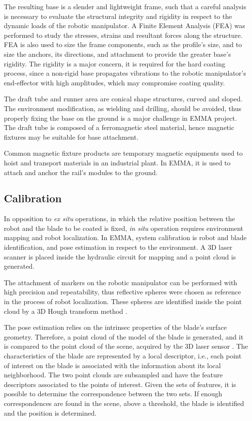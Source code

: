 The resulting base is a slender and lightweight frame, such that a careful
analysis is necessary to evaluate the structural integrity and rigidity in
respect to the dynamic loads of the robotic manipulator. A Finite Element
Analysis (FEA) was performed to study the stresses, strains and resultant forces
along the structure. FEA is also used to size the frame components, such as
the profile's size, and to size the anchors, its directions, and attachment to
provide the greater base's rigidity. The rigidity is a major concern, it is
required for the hard coating process, since a non-rigid base propagates
vibrations to the robotic manipulator's end-effector with high amplitudes, which
may compromise coating quality.

The draft tube and runner area are conical shape structures, curved and
sloped. The environment modification, as wielding and drilling, should be
avoided, thus properly fixing the base on the ground is a major challenge in
EMMA project. The draft tube is composed of a ferromagnetic steel material,
hence magnetic fixtures may be suitable for base attachment. 

Common magnetic fixture products are temporary magnetic equipments used to hoist
and transport materials in an industrial plant. In EMMA, it is used to attach
and anchor the rail's modules to the ground. 


\subsection{Calibration}

In opposition to \textit{ex situ} operations, in which the relative position
between the robot and the blade to be coated is fixed, \textit{in situ}
operation requires environment mapping and robot localization. In
EMMA, system calibration is robot and blade identification, and pose estimation in
respect to the environment. A 3D laser scanner is placed inside the hydraulic
circuit for mapping and a point cloud is generated.
 
The attachment of markers on the robotic manipulator can be performed with high
precision and repeatability, thus reflective spheres were chosen as reference
in the process of robot localization. These spheres are identified inside the
point cloud by a 3D Hough transform method \cite{camurri20143d}.

The pose estimation relies on the intrinsec properties of the blade's surface
geometry. Therefore, a point cloud of the model of the blade is generated, and
it is compared to the point cloud of the scene, acquired by the 3D laser sensor
\cite{Tombari2010a}. The characteristics of the blade are represented by a local
descriptor, i.e., each point of interest on the blade is associated with the
information about its local neighborhood. The two point clouds are subsampled
and have the feature descriptors associated to the points of interest. Given the
sets of features,  it is possible to determine the correspondence between the
two sets. If enough correspondences are found in the scene, above a threshold,
the blade is identified and the position is determined.
